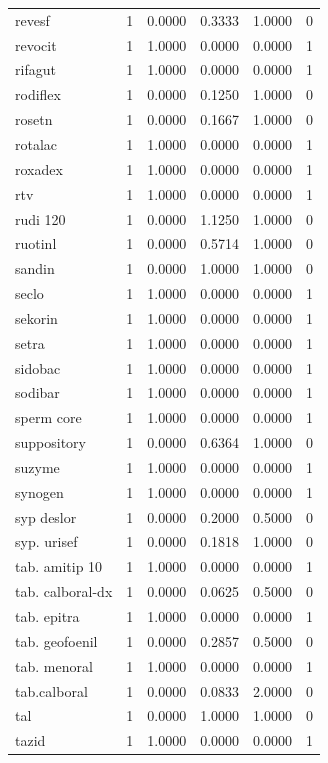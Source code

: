 \begin{longtable}{p{3.0cm}rrrrr}
revesf & 1 & 0.0000 & 0.3333 & 1.0000 & 0 \\
revocit & 1 & 1.0000 & 0.0000 & 0.0000 & 1 \\
rifagut & 1 & 1.0000 & 0.0000 & 0.0000 & 1 \\
rodiflex & 1 & 0.0000 & 0.1250 & 1.0000 & 0 \\
rosetn & 1 & 0.0000 & 0.1667 & 1.0000 & 0 \\
rotalac & 1 & 1.0000 & 0.0000 & 0.0000 & 1 \\
roxadex & 1 & 1.0000 & 0.0000 & 0.0000 & 1 \\
rtv & 1 & 1.0000 & 0.0000 & 0.0000 & 1 \\
rudi 120 & 1 & 0.0000 & 1.1250 & 1.0000 & 0 \\
ruotinl & 1 & 0.0000 & 0.5714 & 1.0000 & 0 \\
sandin & 1 & 0.0000 & 1.0000 & 1.0000 & 0 \\
seclo & 1 & 1.0000 & 0.0000 & 0.0000 & 1 \\
sekorin & 1 & 1.0000 & 0.0000 & 0.0000 & 1 \\
setra & 1 & 1.0000 & 0.0000 & 0.0000 & 1 \\
sidobac & 1 & 1.0000 & 0.0000 & 0.0000 & 1 \\
sodibar & 1 & 1.0000 & 0.0000 & 0.0000 & 1 \\
sperm core & 1 & 1.0000 & 0.0000 & 0.0000 & 1 \\
suppository & 1 & 0.0000 & 0.6364 & 1.0000 & 0 \\
suzyme & 1 & 1.0000 & 0.0000 & 0.0000 & 1 \\
synogen & 1 & 1.0000 & 0.0000 & 0.0000 & 1 \\
syp deslor & 1 & 0.0000 & 0.2000 & 0.5000 & 0 \\
syp. urisef & 1 & 0.0000 & 0.1818 & 1.0000 & 0 \\
tab. amitip 10 & 1 & 1.0000 & 0.0000 & 0.0000 & 1 \\
tab. calboral-dx & 1 & 0.0000 & 0.0625 & 0.5000 & 0 \\
tab. epitra & 1 & 1.0000 & 0.0000 & 0.0000 & 1 \\
tab. geofoenil & 1 & 0.0000 & 0.2857 & 0.5000 & 0 \\
tab. menoral & 1 & 1.0000 & 0.0000 & 0.0000 & 1 \\
tab.calboral & 1 & 0.0000 & 0.0833 & 2.0000 & 0 \\
tal & 1 & 0.0000 & 1.0000 & 1.0000 & 0 \\
tazid & 1 & 1.0000 & 0.0000 & 0.0000 & 1 \\

\end{longtable}
